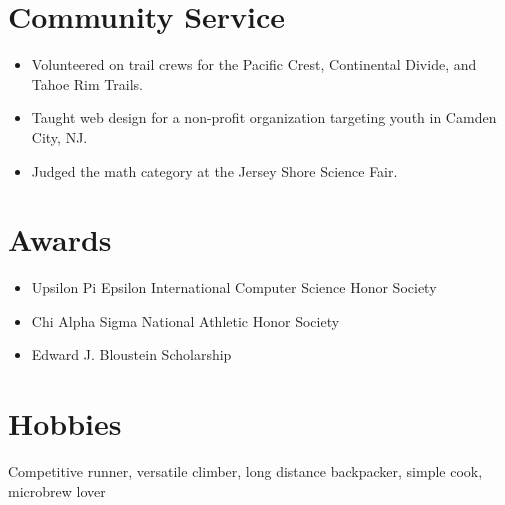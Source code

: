 \documentclass[10.5pt,a4paper,sans]{moderncv}        %
\begin{document}
\section{Community Service}
\begin{itemize}
  \item Volunteered on trail crews for the Pacific Crest, Continental Divide, and Tahoe Rim Trails.
  \item Taught web design for a non-profit organization targeting youth in Camden City, NJ.
  \item Judged the math category at the Jersey Shore Science Fair.
\end{itemize}

\section{Awards}
\begin{itemize}
\item Upsilon Pi Epsilon International Computer Science Honor Society
\item Chi Alpha Sigma National Athletic Honor Society
\item Edward J. Bloustein Scholarship
\end{itemize}

\section{Hobbies}
Competitive runner, versatile climber, long distance backpacker, simple cook, microbrew lover


\clearpage
\end{document}
